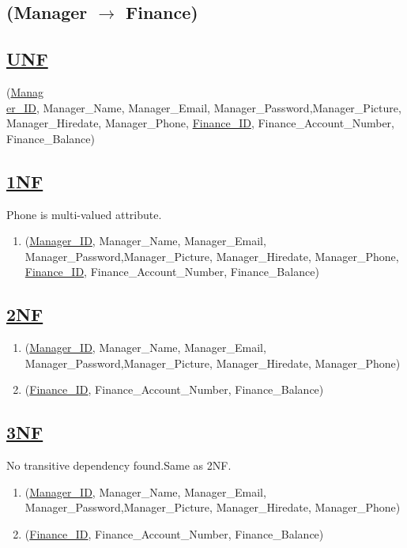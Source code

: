 \subsection{\texorpdfstring{\centering (Manager  $\rightarrow$ Finance)}{(Manager - Finance)}}

\subsection*{\underline{UNF}}

(\underline{Manag\\er\_ID}, Manager\_Name, Manager\_Email, Manager\_Password,Manager\_Picture, Manager\_Hiredate, Manager\_Phone,
\underline{Finance\_ID}, Finance\_Account\_Number, Finance\_Balance)

\subsection*{\underline{1NF}}
Phone is multi-valued attribute.
\vskip 0.2in

\begin{enumerate}
    \item
          (\underline{Manager\_ID}, Manager\_Name, Manager\_Email, Manager\_Password,Manager\_Picture, Manager\_Hiredate, Manager\_Phone,
          \underline{Finance\_ID}, Finance\_Account\_Number, Finance\_Balance)
\end{enumerate}

\subsection*{\underline{2NF}}
\begin{enumerate}
    \item (\underline{Manager\_ID}, Manager\_Name, Manager\_Email, Manager\_Password,Manager\_Picture, Manager\_Hiredate, Manager\_Phone)
    \item (\underline{Finance\_ID}, Finance\_Account\_Number, Finance\_Balance)
\end{enumerate}

\subsection*{\underline{3NF}}
No transitive dependency found.Same as 2NF.
\begin{enumerate}
    \item (\underline{Manager\_ID}, Manager\_Name, Manager\_Email, Manager\_Password,Manager\_Picture, Manager\_Hiredate, Manager\_Phone)
    \item (\underline{Finance\_ID}, Finance\_Account\_Number, Finance\_Balance)
\end{enumerate}
